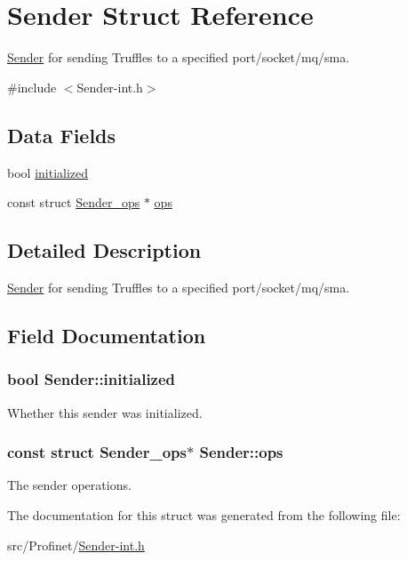 \hypertarget{struct_sender}{\section{Sender Struct Reference}
\label{struct_sender}
}


\hyperlink{struct_sender}{Sender} for sending Truffles to a specified port/socket/mq/sma.  




{\ttfamily \#include $<$Sender-\/int.\-h$>$}

\subsection*{Data Fields}
\begin{DoxyCompactItemize}
\item 
bool \hyperlink{struct_sender_afb5b34bfb1a846008ee2d7e725ba5e12}{initialized}
\item 
const struct \hyperlink{struct_sender__ops}{Sender\-\_\-ops} $\ast$ \hyperlink{struct_sender_afaa1a69a492fece5b53b670bdb9d3b69}{ops}
\end{DoxyCompactItemize}


\subsection{Detailed Description}
\hyperlink{struct_sender}{Sender} for sending Truffles to a specified port/socket/mq/sma. 

\subsection{Field Documentation}
\hypertarget{struct_sender_afb5b34bfb1a846008ee2d7e725ba5e12}{
\subsubsection[{initialized}]{\setlength{\rightskip}{0pt plus 5cm}bool Sender\-::initialized}}\label{struct_sender_afb5b34bfb1a846008ee2d7e725ba5e12}
Whether this sender was initialized. \hypertarget{struct_sender_afaa1a69a492fece5b53b670bdb9d3b69}{
\subsubsection[{ops}]{\setlength{\rightskip}{0pt plus 5cm}const struct {\bf Sender\-\_\-ops}$\ast$ Sender\-::ops}}\label{struct_sender_afaa1a69a492fece5b53b670bdb9d3b69}
The sender operations. 

The documentation for this struct was generated from the following file\-:\begin{DoxyCompactItemize}
\item 
src/\-Profinet/\hyperlink{_sender-int_8h}{Sender-\/int.\-h}\end{DoxyCompactItemize}
